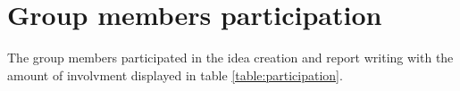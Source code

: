 \section{Group members participation}

The group members participated in the idea creation and report writing with the amount of involvment displayed in table \ref{table:participation}.

\begin{table}[ht!]
\centering
{}
\caption{Work repartition}
\label{table:participation}
\end{table}
